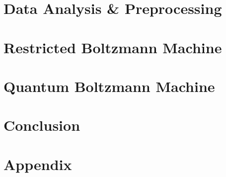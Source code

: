 \documentclass[12pt,twoside]{report}
\begin{document}
\chapter{Data Analysis \& Preprocessing}
\label{ch:data_analysis}


\chapter{Restricted Boltzmann Machine}
\label{ch:rbm}


\chapter{Quantum Boltzmann Machine}
\label{ch:qbm}


\chapter{Conclusion}
\label{ch:conclusion}


\appendix
\chapter{Appendix}
\label{ch:appendix}


\end{document}
